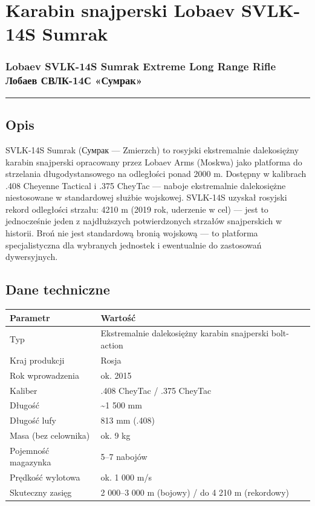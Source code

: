 \documentclass[12pt,openany,oneside]{book}
\begin{document}
\chapter{Karabin snajperski Lobaev SVLK-14S
Sumrak}\label{karabin-snajperski-lobaev-svlk-14s-sumrak}

\subsection{Lobaev SVLK-14S Sumrak Extreme Long Range Rifle \textbar{}
Лобаев СВЛК-14С
«Сумрак»}\label{lobaev-svlk-14s-sumrak-extreme-long-range-rifle-ux43bux43eux431ux430ux435ux432-ux441ux432ux43bux43a-14ux441-ux441ux443ux43cux440ux430ux43a}

\begin{center}\rule{0.5\linewidth}{0.5pt}\end{center}

\section{Opis}\label{opis-67}

SVLK-14S Sumrak (Сумрак --- Zmierzch) to rosyjski ekstremalnie
dalekosiężny karabin snajperski opracowany przez Lobaev Arms (Moskwa)
jako platforma do strzelania długodystansowego na odległości ponad 2000
m. Dostępny w kalibrach .408 Cheyenne Tactical i .375 CheyTac --- naboje
ekstremalnie dalekosiężne niestosowane w standardowej służbie wojskowej.
SVLK-14S uzyskał rosyjski rekord odległości strzału: 4210 m (2019 rok,
uderzenie w cel) --- jest to jednocześnie jeden z najdłuższych
potwierdzonych strzałów snajperskich w historii. Broń nie jest
standardową bronią wojskową --- to platforma specjalistyczna dla
wybranych jednostek i ewentualnie do zastosowań dywersyjnych.

\section{Dane techniczne}\label{dane-techniczne-67}

\begin{longtable}[]{@{}ll@{}}
\toprule\noalign{}
Parametr & Wartość \\
\midrule\noalign{}
\endhead
\bottomrule\noalign{}
\endlastfoot
Typ & Ekstremalnie dalekosiężny karabin snajperski bolt-action \\
Kraj produkcji & Rosja \\
Rok wprowadzenia & ok. 2015 \\
Kaliber & .408 CheyTac / .375 CheyTac \\
Długość & \textasciitilde1 500 mm \\
Długość lufy & 813 mm (.408) \\
Masa (bez celownika) & ok. 9 kg \\
Pojemność magazynka & 5--7 nabojów \\
Prędkość wylotowa & ok. 1 000 m/s \\
Skuteczny zasięg & 2 000--3 000 m (bojowy) / do 4 210 m (rekordowy) \\
\end{longtable}
\end{document}
